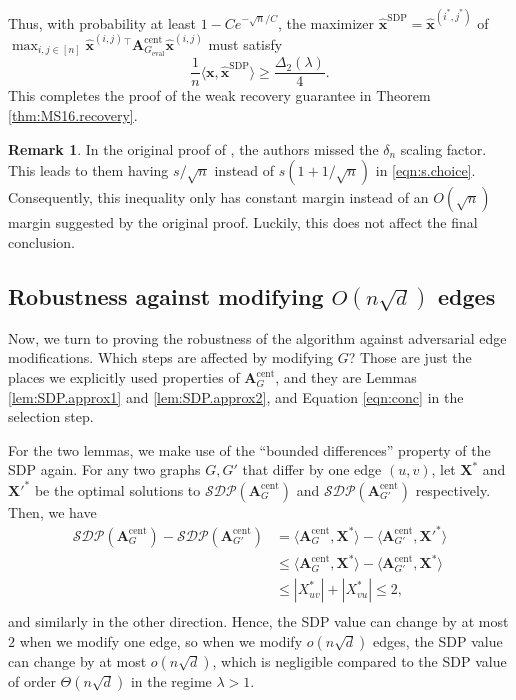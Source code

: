 \documentclass[11pt, titlepage]{article} %
\numberwithin{equation}{section}
\theoremstyle{definition}
\newtheorem{remark}{Remark}
\numberwithin{theorem}{section}
\numberwithin{lemma}{section}
\numberwithin{corollary}{section}
\numberwithin{proposition}{section}
\numberwithin{definition}{section}
\numberwithin{remark}{section}
\begin{document}
Thus, with probability at least $1 - Ce^{-\sqrt{n}/C}$, the maximizer 
$\hat{\bm{x}}^\mathrm{SDP} = \hat{\bm{x}}^{(i^*, j^*)}$ of 
$\max_{i, j \in [n]} \hat{\bm{x}}^{(i,j)}{}^\top \bm{A}_{G_\mathrm{eval}}^\mathrm{cent} \hat{\bm{x}}^{(i,j)}$
must satisfy
\[
\frac{1}{n} \langle \bm{x}, \hat{\bm{x}}^\mathrm{SDP} \rangle \geq \frac{\Delta_2(\lambda)}{4}.
\]
This completes the proof of the weak recovery guarantee in Theorem \ref{thm:MS16.recovery}.

\begin{remark}
In the original proof of \cite{MS16}, the authors missed the $\delta_n$ scaling factor. This leads
to them having $s/\sqrt{n}$ instead of $s(1 + 1/\sqrt{n})$ in \cref{eqn:s.choice}. Consequently, 
this inequality only has constant margin instead of an $O(\sqrt{n})$ margin suggested by the original
proof. Luckily, this does not affect the final conclusion.
\end{remark}

\subsection{Robustness against modifying $O(n\sqrt{d})$ edges}
Now, we turn to proving the robustness of the algorithm against adversarial edge modifications.
Which steps are affected by modifying $G$? Those are just the places we explicitly used
properties of $\bm{A}_{G}^\mathrm{cent}$, and they are Lemmas \ref{lem:SDP.approx1} and \ref{lem:SDP.approx2},
and Equation \ref{eqn:conc} in the selection step.

For the two lemmas, we make use of the ``bounded differences'' property of the SDP again.
For any two graphs $G, G'$ that differ by one edge $(u,v)$, let $\bm{X}^*$ and $\bm{X}'^*$ be the optimal solutions 
to $\mathcal{SDP}(\bm{A}_{G}^\mathrm{cent})$ and $\mathcal{SDP}(\bm{A}_{G'}^\mathrm{cent})$ respectively.
Then, we have
\begin{align*}
\mathcal{SDP}(\bm{A}_{G}^\mathrm{cent}) - \mathcal{SDP}(\bm{A}_{G'}^\mathrm{cent})
& = \langle \bm{A}_{G}^\mathrm{cent}, \bm{X}^* \rangle - \langle \bm{A}_{G'}^\mathrm{cent}, \bm{X}'^* \rangle\\
& \leq \langle \bm{A}_{G}^\mathrm{cent}, \bm{X}^* \rangle - \langle \bm{A}_{G'}^\mathrm{cent}, \bm{X}^* \rangle\\
& \leq |X_{uv}^*| + |X_{vu}^*| \leq 2,\\
\end{align*}
and similarly in the other direction. Hence, the SDP value can change by at most $2$ when we modify
one edge, so when we modify $o(n\sqrt{d})$ edges, the SDP value can change by at most $o(n\sqrt{d})$,
which is negligible compared to the SDP value of order $\Theta(n\sqrt{d})$ in the regime $\lambda > 1$.
\end{document}
